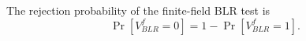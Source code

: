 \begin{definition}
\label{def:ff-blr-reject-prob}
\leanok
The rejection probability of the finite-field BLR test is
  \[
    \Pr[V_{BLR}^f = 0] = 1 - \Pr[V_{BLR}^f = 1].
  \]
\end{definition}
